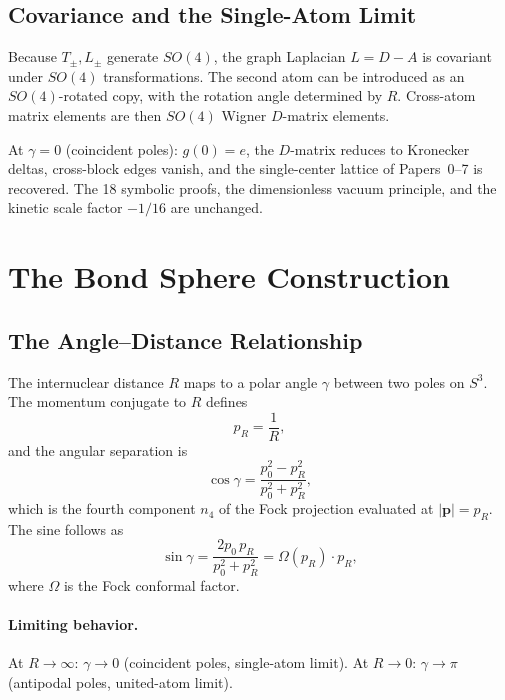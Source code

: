 \documentclass[aps,pra,twocolumn,superscriptaddress,longbibliography]{revtex4-2}
\begin{document}
\subsection{Covariance and the Single-Atom Limit}

Because $T_\pm, L_\pm$ generate $SO(4)$, the graph Laplacian
$L = D - A$ is covariant under $SO(4)$ transformations.  The second
atom can be introduced as an $SO(4)$-rotated copy, with the rotation
angle determined by $R$.  Cross-atom matrix elements are then $SO(4)$
Wigner $D$-matrix elements.

At $\gamma = 0$ (coincident poles): $g(0) = e$, the $D$-matrix reduces
to Kronecker deltas, cross-block edges vanish, and the single-center
lattice of Papers~0--7 is recovered.  The 18 symbolic proofs, the
dimensionless vacuum principle, and the kinetic scale factor $-1/16$
are unchanged.


\section{The Bond Sphere Construction}
\label{sec:bond_sphere}

\subsection{The Angle--Distance Relationship}

The internuclear distance $R$ maps to a polar angle $\gamma$ between
two poles on $S^3$.  The momentum conjugate to $R$ defines
\begin{equation}
p_R = \frac{1}{R},
\label{eq:pR}
\end{equation}
and the angular separation is
\begin{equation}
\cos\gamma = \frac{p_0^2 - p_R^2}{p_0^2 + p_R^2},
\label{eq:cos_gamma}
\end{equation}
which is the fourth component $n_4$ of the Fock projection evaluated
at $|\mathbf{p}| = p_R$.  The sine follows as
\begin{equation}
\sin\gamma = \frac{2p_0\, p_R}{p_0^2 + p_R^2} = \Omega(p_R)\cdot p_R,
\label{eq:sin_gamma}
\end{equation}
where $\Omega$ is the Fock conformal factor.

\paragraph{Limiting behavior.}
At $R \to \infty$: $\gamma \to 0$ (coincident poles, single-atom limit).
At $R \to 0$: $\gamma \to \pi$ (antipodal poles, united-atom limit).
\end{document}
